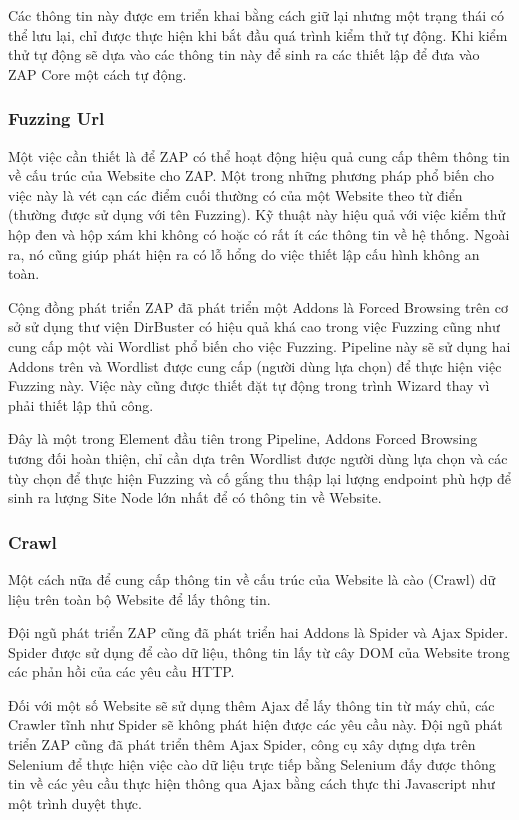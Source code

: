 \documentclass[./../main.tex]{subfiles}
\begin{document}
Các thông tin này được em triển khai bằng cách giữ lại nhưng một trạng thái có thể lưu lại, chỉ được thực hiện khi bắt đầu quá trình kiểm thử tự động. Khi kiểm thử tự động sẽ dựa vào các thông tin này để sinh ra các thiết lập để đưa vào ZAP Core một cách tự động.

\subsubsection{Fuzzing Url}
Một việc cần thiết là để ZAP có thể hoạt động hiệu quả cung cấp thêm thông tin về cấu trúc của Website cho ZAP. Một trong những phương pháp phổ biến cho việc này là vét cạn các điểm cuối thường có của một Website theo từ điển (thường được sử dụng với tên Fuzzing). Kỹ thuật này hiệu quả với việc kiểm thử hộp đen và hộp xám khi không có hoặc có rất ít các thông tin về hệ thống. Ngoài ra, nó cũng giúp phát hiện ra có lỗ hổng do việc thiết lập cấu hình không an toàn.

Cộng đồng phát triển ZAP đã phát triển một Addons là Forced Browsing trên cơ sở sử dụng thư viện DirBuster có hiệu quả khá cao trong việc Fuzzing cũng như cung cấp một vài Wordlist phổ biến cho việc Fuzzing. Pipeline này sẽ sử dụng hai Addons trên và Wordlist được cung cấp (người dùng lựa chọn) để thực hiện việc Fuzzing này. Việc này cũng được thiết đặt tự động trong trình Wizard thay vì phải thiết lập thủ công.

Đây là một trong Element đầu tiên trong Pipeline, Addons Forced Browsing tương đối hoàn thiện, chỉ cần dựa trên Wordlist được người dùng lựa chọn và các tùy chọn để thực hiện Fuzzing và cố gắng thu thập lại lượng endpoint phù hợp để sinh ra lượng Site Node lớn nhất để có thông tin về Website.

\subsubsection{Crawl}

Một cách nữa để cung cấp thông tin về cấu trúc của Website là cào (Crawl) dữ liệu trên toàn bộ Website để lấy thông tin.

Đội ngũ phát triển ZAP cũng đã phát triển hai Addons là Spider và Ajax Spider. Spider được sử dụng để cào dữ liệu, thông tin lấy từ cây DOM của Website trong các phản hồi của các yêu cầu HTTP.

Đối với một số Website sẽ sử dụng thêm Ajax để lấy thông tin từ máy chủ, các Crawler tĩnh như Spider sẽ không phát hiện được các yêu cầu này. Đội ngũ phát triển ZAP cũng đã phát triển thêm Ajax Spider, công cụ xây dựng dựa trên Selenium để thực hiện việc cào dữ liệu trực tiếp bằng Selenium đấy được thông tin về các yêu cầu thực hiện thông qua Ajax bằng cách thực thi Javascript như một trình duyệt thực.
\end{document}

